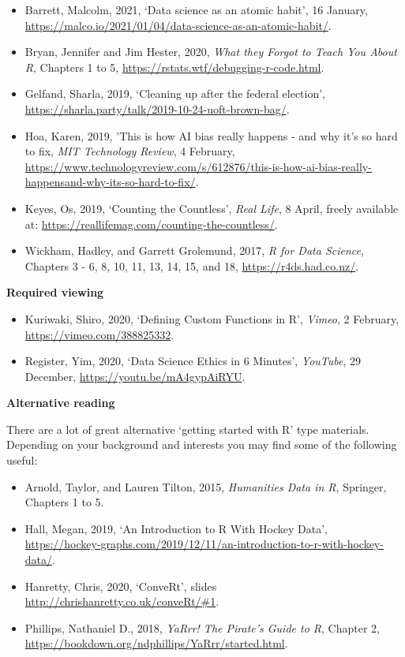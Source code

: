 \documentclass[
]{book}
\providecommand{\tightlist}{%
  \setlength{\itemsep}{0pt}\setlength{\parskip}{0pt}}
\begin{document}
\begin{itemize}
\tightlist
\item
  Barrett, Malcolm, 2021, `Data science as an atomic habit', 16 January, \url{https://malco.io/2021/01/04/data-science-as-an-atomic-habit/}.
\item
  Bryan, Jennifer and Jim Hester, 2020, \emph{What they Forgot to Teach You About R}, Chapters 1 to 5, \url{https://rstats.wtf/debugging-r-code.html}.
\item
  Gelfand, Sharla, 2019, `Cleaning up after the federal election', \url{https://sharla.party/talk/2019-10-24-uoft-brown-bag/}.
\item
  Hoa, Karen, 2019, 'This is how AI bias really happens - and why it's so hard to fix, \emph{MIT Technology Review}, 4 February, \url{https://www.technologyreview.com/s/612876/this-is-how-ai-bias-really-happensand-why-its-so-hard-to-fix/}.
\item
  Keyes, Os, 2019, `Counting the Countless', \emph{Real Life}, 8 April, freely available at: \url{https://reallifemag.com/counting-the-countless/}.
\item
  Wickham, Hadley, and Garrett Grolemund, 2017, \emph{R for Data Science}, Chapters 3 - 6, 8, 10, 11, 13, 14, 15, and 18, \url{https://r4ds.had.co.nz/}.
\end{itemize}

\textbf{Required viewing}

\begin{itemize}
\tightlist
\item
  Kuriwaki, Shiro, 2020, `Defining Custom Functions in R', \emph{Vimeo}, 2 February, \url{https://vimeo.com/388825332}.
\item
  Register, Yim, 2020, `Data Science Ethics in 6 Minutes', \emph{YouTube}, 29 December, \url{https://youtu.be/mA4gypAiRYU}.
\end{itemize}

\textbf{Alternative reading}

There are a lot of great alternative `getting started with R' type materials. Depending on your background and interests you may find some of the following useful:

\begin{itemize}
\tightlist
\item
  Arnold, Taylor, and Lauren Tilton, 2015, \emph{Humanities Data in R}, Springer, Chapters 1 to 5.
\item
  Hall, Megan, 2019, `An Introduction to R With Hockey Data', \url{https://hockey-graphs.com/2019/12/11/an-introduction-to-r-with-hockey-data/}.
\item
  Hanretty, Chris, 2020, `ConveRt', slides \url{http://chrishanretty.co.uk/conveRt/\#1}.
\item
  Phillips, Nathaniel D., 2018, \emph{YaRrr! The Pirate's Guide to R}, Chapter 2, \url{https://bookdown.org/ndphillips/YaRrr/started.html}.
\end{itemize}
\end{document}

